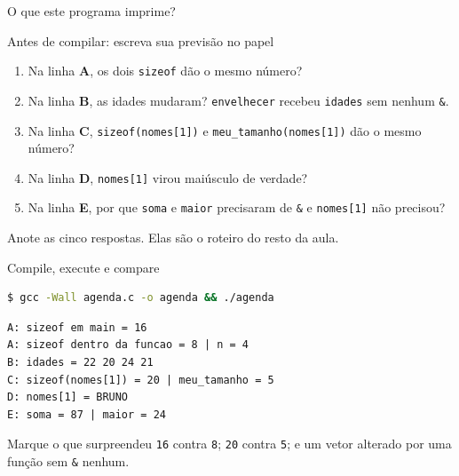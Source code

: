 \documentclass[aspectratio=169]{beamer}
\begin{document}
\begin{frame}{O que este programa imprime?}
  \begin{alertblock}{Antes de compilar: escreva sua previsão no papel}
    \begin{enumerate}
      \item Na linha \textbf{A}, os dois \texttt{sizeof} dão o mesmo número?
      \item Na linha \textbf{B}, as idades mudaram? \texttt{envelhecer} recebeu
            \texttt{idades} sem nenhum \texttt{\&}.
      \item Na linha \textbf{C}, \texttt{sizeof(nomes[1])} e
            \texttt{meu\_tamanho(nomes[1])} dão o mesmo número?
      \item Na linha \textbf{D}, \texttt{nomes[1]} virou maiúsculo de verdade?
      \item Na linha \textbf{E}, por que \texttt{soma} e \texttt{maior}
            precisaram de \texttt{\&} e \texttt{nomes[1]} não precisou?
    \end{enumerate}
  \end{alertblock}
  \begin{center}\small
    Anote as cinco respostas. Elas são o roteiro do resto da aula.
  \end{center}
\end{frame}

\begin{frame}[fragile]{Compile, execute e compare}
\begin{lstlisting}[numbers=none, language=bash]
$ gcc -Wall agenda.c -o agenda && ./agenda
\end{lstlisting}
\begin{lstlisting}[numbers=none, language={}]
A: sizeof em main = 16
A: sizeof dentro da funcao = 8 | n = 4
B: idades = 22 20 24 21
C: sizeof(nomes[1]) = 20 | meu_tamanho = 5
D: nomes[1] = BRUNO
E: soma = 87 | maior = 24
\end{lstlisting}
  \begin{block}{Marque o que surpreendeu}
    \texttt{16} contra \texttt{8}; \texttt{20} contra \texttt{5}; e um vetor
    alterado por uma função sem \texttt{\&} nenhum.
  \end{block}
\end{frame}
\end{document}
